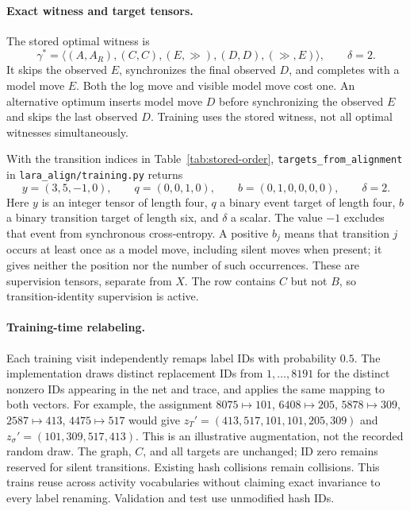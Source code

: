 \documentclass[11pt]{article}
\begin{document}
\paragraph{Exact witness and target tensors.}
The stored optimal witness is
\[
 \gamma^*=\langle(A,A_R),(C,C),(E,\gg),(D,D),(\gg,E)\rangle,
 \qquad\delta=2.
\]
It skips the observed $E$, synchronizes the final observed $D$, and completes
with a model move $E$. Both the log move and visible model move cost one.
An alternative optimum inserts model move $D$ before synchronizing the observed
$E$ and skips the last observed $D$. Training uses the stored witness, not all
optimal witnesses simultaneously.

With the transition indices in Table~\ref{tab:stored-order},
\texttt{targets\_from\_alignment} in \texttt{lara\_align/training.py} returns
\[
 y=(3,5,-1,0),\qquad q=(0,0,1,0),\qquad
 b=(0,1,0,0,0,0),\qquad\delta=2.
\]
Here $y$ is an integer tensor of length four, $q$ a binary event target of
length four, $b$ a binary transition target of length six, and $\delta$ a scalar.
The value $-1$ excludes that event from synchronous cross-entropy. A positive
$b_j$ means that transition $j$ occurs at least once as a model move, including
silent moves when present; it gives neither the position nor the number of
such occurrences. These are supervision tensors, separate from $X$.
The row contains $C$ but not $B$, so transition-identity supervision is active.

\paragraph{Training-time relabeling.}
Each training visit independently remaps label IDs with probability $0.5$.
The implementation draws distinct replacement IDs from $1,\ldots,8191$ for
the distinct nonzero IDs appearing in the net and trace, and applies the same
mapping to both vectors. For example, the assignment
$8075\mapsto101$, $6408\mapsto205$, $5878\mapsto309$,
$2587\mapsto413$, $4475\mapsto517$ would give
$z_T'=(413,517,101,101,205,309)$ and
$z_\sigma'=(101,309,517,413)$. This is an illustrative augmentation, not the
recorded random draw. The graph, $C$, and all targets are unchanged; ID zero
remains reserved for silent transitions. Existing hash collisions remain
collisions. This trains reuse across activity vocabularies without claiming
exact invariance to every label renaming. Validation and test use unmodified
hash IDs.

\FloatBarrier
\end{document}
